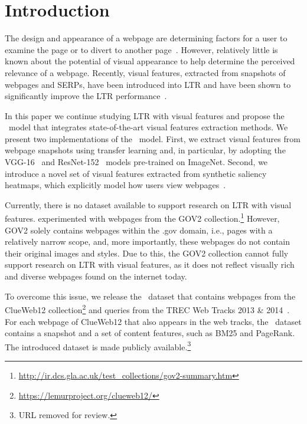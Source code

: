 
\section{Introduction}
The design and appearance of a webpage are determining factors for a user to examine the page or to divert to another page~\cite{nielsen1999designing,nielsen2006f,pernice2017f,wang2014eye}.
However, relatively little is known about the potential of visual appearance to help determine the perceived relevance of a webpage.
Recently, visual features, extracted from snapshots of webpages and \acp{SERP}, have been introduced into \acf{LTR}
and have been shown to significantly improve the \ac{LTR} performance~\cite{fan2017learning,zhang2018relevance}.

In this paper we continue studying \ac{LTR} with visual features and propose the \modelnamef~model
that integrates state-of-the-art visual features extraction methods.
We present two implementations of the \modelname~model.
First, we extract visual features from webpage snapshots using transfer learning and, in particular, by adopting the VGG-16~\cite{simonyan2014very} and ResNet-152~\cite{he2016deep} models pre-trained on ImageNet.
Second, we introduce a novel set of visual features extracted from synthetic saliency heatmaps, which explicitly model how users view webpages~\cite{shan2017two}.

Currently, there is no dataset available to support research on \ac{LTR} with visual features.
\citet{fan2017learning} experimented with webpages from the GOV2 collection.\footnote{\url{http://ir.dcs.gla.ac.uk/test_collections/gov2-summary.htm}}
However, GOV2 solely contains webpages within the .gov domain, i.e., pages with a relatively narrow scope,
and, more importantly, these webpages do not contain their original images and styles.
Due to this, the GOV2 collection cannot fully support research on \ac{LTR} with visual features, as it does not reflect visually rich and diverse webpages found on the internet today.

To overcome this issue, we release the \datasetname~dataset that contains webpages from the ClueWeb12 collection\footnote{\url{https://lemurproject.org/clueweb12/}}
and queries from the TREC Web Tracks 2013 \& 2014~\cite{collins2013trec,collins2015trec}.
For each webpage of ClueWeb12 that also appears in the web tracks, the \datasetname~dataset contains a snapshot
and a set of content features, such as BM25 and PageRank.
The introduced dataset is made publicly available.\footnote{URL removed for review.}

